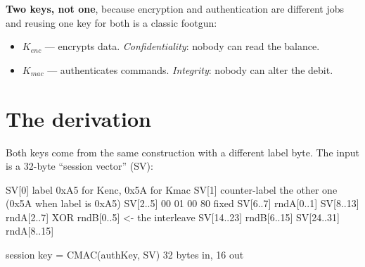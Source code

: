 \textbf{Two keys, not one}, because encryption and authentication are different
jobs and reusing one key for both is a classic footgun:

\begin{itemize}
  \item $K_{enc}$ --- encrypts data. \emph{Confidentiality}: nobody can read the balance.
  \item $K_{mac}$ --- authenticates commands. \emph{Integrity}: nobody can alter the debit.
\end{itemize}

\section{The derivation}

Both keys come from the same construction with a different label byte. The input
is a 32-byte ``session vector'' (SV):

\begin{center}
\end{center}

\begin{trace}
SV[0]      label            0xA5 for Kenc, 0x5A for Kmac
SV[1]      counter-label    the other one (0x5A when label is 0xA5)
SV[2..5]   00 01 00 80      fixed
SV[6..7]   rndA[0..1]
SV[8..13]  rndA[2..7] XOR rndB[0..5]      <- the interleave
SV[14..23] rndB[6..15]
SV[24..31] rndA[8..15]

session key = CMAC(authKey, SV)           32 bytes in, 16 out
\end{trace}

